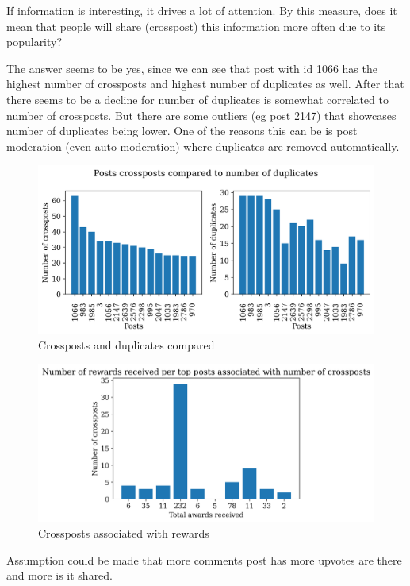 If information is interesting, it drives a lot of attention. By this measure, does it mean that people will share (crosspost) this information more often due to its popularity?

The answer seems to be yes, since we can see that post with id 1066 has the highest number of crossposts and highest number  of duplicates as well. After that there seems to be a decline for number of duplicates is somewhat correlated to number of crossposts. But there are some outliers (eg post 2147) that showcases number of duplicates being lower. One of the reasons this can be is post moderation (even auto moderation) where duplicates are removed automatically.
\begin{figure}[H]
\includegraphics[scale=0.70]{img/A1/num_crossposts_double_histogram.png}
\centering
\caption{Crossposts and duplicates compared}
\label{fig:num_crossposts_double_histogram}
\end{figure}


\begin{figure}[H]
\includegraphics[scale=0.70]{img/A1/num_crossposts_plot.png}
\centering
\caption{Crossposts associated with rewards}
\label{fig:num_crossposts_plot}
\end{figure}


Assumption could be made that more comments post has more upvotes are there and more is it shared. 


